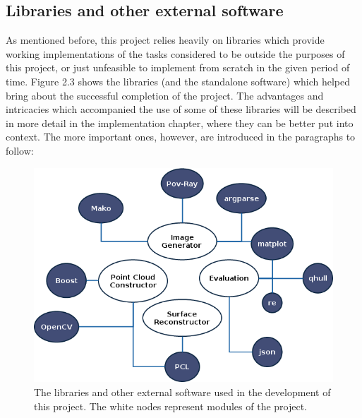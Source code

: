 \documentclass[12pt,a4paper,twoside,openright]{report}
\begin{document}
\subsection{Libraries and other external software}
As mentioned before, this project relies heavily on libraries which provide working implementations of the tasks considered to be outside the purposes of this project, or just unfeasible to implement from scratch in the given period of time. Figure 2.3 shows the libraries (and the standalone software) which helped bring about the successful completion of the project. The advantages and intricacies which accompanied the use of some of these libraries will be described in more detail in the implementation chapter, where they can be better put into context. The more important ones, however, are introduced in the paragraphs to follow:

\begin{figure}
\centerline{\includegraphics[scale=0.7]{figs/libraries1.png}}
\caption{The libraries and other external software used in the development of this project. The white nodes represent modules of the project.}
\end{figure}
\end{document}
